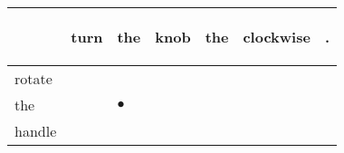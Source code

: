 \documentclass[landscape]{article}
\newcommand{\ssp}{\hspace{2pt}}
\newcommand{\mex}{\cellcolor{g}$\bullet$}
\begin{document}
\newpage

\noindent\begin{tabular}{|l|p{10pt}|p{10pt}|p{10pt}|p{10pt}|p{10pt}|p{10pt}|}
\hline
&\begin{sideways}\cellcolor{ref0}turn\hspace{12pt}\end{sideways}&\begin{sideways}\cellcolor{ref1}the\hspace{12pt}\end{sideways}&\begin{sideways}\cellcolor{ref2}knob\hspace{12pt}\end{sideways}&\begin{sideways}\cellcolor{ref3}the\hspace{12pt}\end{sideways}&\begin{sideways}\cellcolor{ref4}clockwise\hspace{12pt}\end{sideways}&\begin{sideways}\cellcolor{ref5}.\hspace{12pt}\end{sideways}\\
\hline
\ssp rotate \ssp&\hspace{2pt}&\hspace{2pt}&\hspace{2pt}&\hspace{2pt}&\hspace{2pt}&\hspace{2pt}\\
\hline
\ssp \cellcolor{ref1}the \ssp&\hspace{2pt}&\hspace{2pt}\mex&\hspace{2pt}&\hspace{2pt}&\hspace{2pt}&\hspace{2pt}\\
\hline
\ssp handle \ssp&\hspace{2pt}&\hspace{2pt}&\hspace{2pt}&\hspace{2pt}&\hspace{2pt}&\hspace{2pt}\\

\end{tabular}
\end{document}
